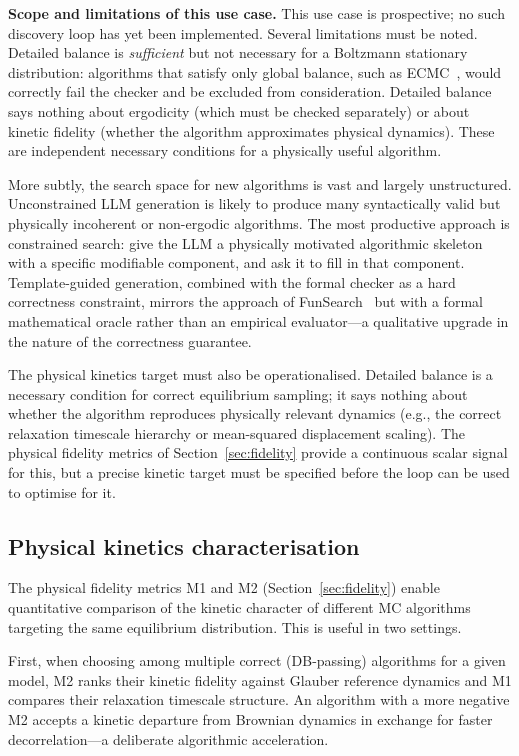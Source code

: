 \documentclass[twocolumn,10pt]{article}
\begin{document}
\medskip\noindent\textbf{Scope and limitations of this use case.}
This use case is prospective; no such discovery loop has yet been
implemented.  Several limitations must be noted.  Detailed balance is
\emph{sufficient} but not necessary for a Boltzmann stationary distribution:
algorithms that satisfy only global balance, such as
ECMC~\cite{Bernard2009}, would correctly fail the checker and be excluded
from consideration.  Detailed balance says nothing about ergodicity (which
must be checked separately) or about kinetic fidelity (whether the algorithm
approximates physical dynamics).  These are independent necessary conditions
for a physically useful algorithm.

More subtly, the search space for new algorithms is vast and largely
unstructured.  Unconstrained LLM generation is likely to produce many
syntactically valid but physically incoherent or non-ergodic algorithms.
The most productive approach is constrained search: give the LLM a physically
motivated algorithmic skeleton with a specific modifiable component, and ask
it to fill in that component.  Template-guided generation, combined with the
formal checker as a hard correctness constraint, mirrors the approach of
FunSearch~\cite{FunSearch2023} but with a formal mathematical oracle rather
than an empirical evaluator---a qualitative upgrade in the nature of the
correctness guarantee.

The physical kinetics target must also be operationalised.  Detailed
balance is a necessary condition for correct equilibrium sampling; it
says nothing about whether the algorithm reproduces physically relevant
dynamics (e.g., the correct relaxation timescale hierarchy or mean-squared
displacement scaling).  The physical fidelity metrics of
Section~\ref{sec:fidelity} provide a continuous scalar signal for this, but
a precise kinetic target must be specified before the loop can be used to
optimise for it.

\subsection{Physical kinetics characterisation}
\label{sec:uc-kinetics}

The physical fidelity metrics M1 and M2 (Section~\ref{sec:fidelity}) enable
quantitative comparison of the kinetic character of different MC algorithms
targeting the same equilibrium distribution.  This is useful in two
settings.

First, when choosing among multiple correct (DB-passing) algorithms for a
given model, M2 ranks their kinetic fidelity against Glauber reference
dynamics and M1 compares their relaxation timescale structure.  An algorithm
with a more negative M2 accepts a kinetic departure from Brownian dynamics in
exchange for faster decorrelation---a deliberate algorithmic acceleration.
\end{document}
